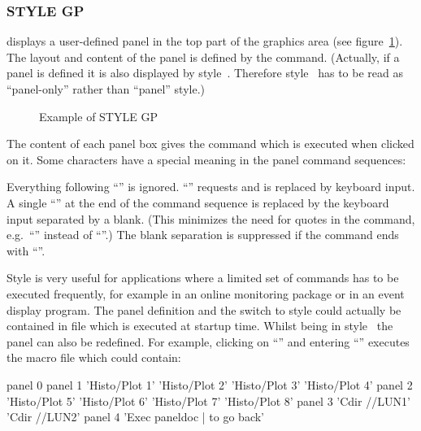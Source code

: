 \subsubsection{STYLE GP}

 displays a user-defined panel in the top part of the
graphics area (see figure~\ref{FIG5}).
The layout and content of the panel is defined by the 
command.
(Actually, if a panel is defined it is also displayed by
style~.
Therefore style~ has to be read as ``panel-only'' rather
than ``panel'' style.)
 
\begin{figure}[tb]
\begin{center}
\mbox{}
\end{center}
\caption{Example of STYLE GP}
\label{FIG5}
\end{figure}

The content of each panel box gives the command which is executed when
clicked on it.
Some characters have a special meaning in the panel command sequences:
Everything following ``\Lit{|}'' is ignored.
``\Lit{$}'' requests and is replaced by keyboard input.
A single ``\Lit{-}'' at the end of the command sequence is replaced
by the keyboard input separated by a blank.
(This minimizes the need for quotes in the  command, e.g.\
``'' instead of ``''.)
The blank separation is suppressed if the command ends with ``\Lit{--}''.

Style  is very useful for applications where a limited set
of commands has to be executed frequently, for example in an online monitoring
package or in an event display program.
The panel definition and the switch to style  could actually
be contained in file which is executed at startup time.
Whilst being in style~\Lit{GP} the panel can also be redefined.
For example, clicking on ``'' and entering
``'' executes the macro file  which
could contain:
\begin{XMP}
panel 0
panel 1 'Histo/Plot 1' 'Histo/Plot 2' 'Histo/Plot 3' 'Histo/Plot 4'
panel 2 'Histo/Plot 5' 'Histo/Plot 6' 'Histo/Plot 7' 'Histo/Plot 8'
panel 3 'Cdir //LUN1' 'Cdir //LUN2'
panel 4 'Exec paneldoc | to go back'
\end{XMP}
%
%
